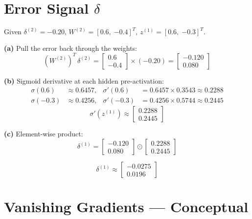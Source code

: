 \documentclass[11pt, a4paper]{article}
\begin{document}
\section{Error Signal $\delta$}

\begin{tcolorbox}[solutionbox]
Given $\delta^{(2)} = -0.20$,\;
$W^{(2)} = [0.6,\; {-0.4}]^T$,\;
$z^{(1)} = [0.6,\; {-0.3}]^T$.

\medskip
\textbf{(a)} Pull the error back through the weights:
\[
  (W^{(2)})^T\,\delta^{(2)}
  = \begin{bmatrix} 0.6 \\ -0.4 \end{bmatrix} \times (-0.20)
  = \begin{bmatrix} -0.120 \\ 0.080 \end{bmatrix}
\]

\medskip
\textbf{(b)} Sigmoid derivative at each hidden pre-activation:
\begin{align*}
\sigma(0.6)  &\approx 0.6457, & \sigma'(0.6)  &= 0.6457 \times 0.3543 \approx 0.2288 \\
\sigma(-0.3) &\approx 0.4256, & \sigma'(-0.3) &= 0.4256 \times 0.5744 \approx 0.2445
\end{align*}
\[
  \sigma'(z^{(1)}) \approx \begin{bmatrix} 0.2288 \\ 0.2445 \end{bmatrix}
\]

\medskip
\textbf{(c)} Element-wise product:
\[
  \delta^{(1)}
  = \begin{bmatrix} -0.120 \\ 0.080 \end{bmatrix}
    \odot
    \begin{bmatrix} 0.2288 \\ 0.2445 \end{bmatrix}
\]

\begin{tcolorbox}[answerbox]
$$\delta^{(1)} \approx \begin{bmatrix} -0.0275 \\ 0.0196 \end{bmatrix}$$
\end{tcolorbox}
\end{tcolorbox}

\section{Vanishing Gradients — Conceptual}
\end{document}
